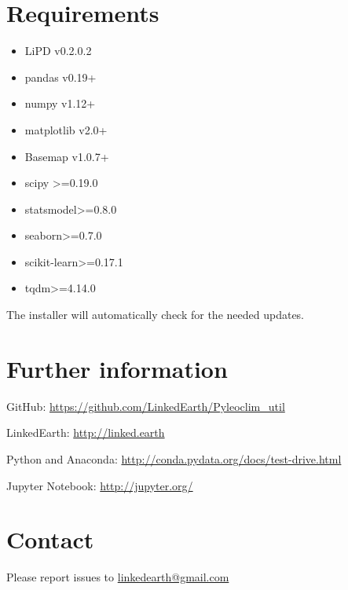 \documentclass[letterpaper,10pt,english]{sphinxmanual}
\begin{document}
\section{Requirements}
\label{\detokenize{Introduction:requirements}}\begin{itemize}
\item {} 
LiPD v0.2.0.2

\item {} 
pandas v0.19+

\item {} 
numpy v1.12+

\item {} 
matplotlib v2.0+

\item {} 
Basemap v1.0.7+

\item {} 
scipy \textgreater{}=0.19.0

\item {} 
statsmodel\textgreater{}=0.8.0

\item {} 
seaborn\textgreater{}=0.7.0

\item {} 
scikit-learn\textgreater{}=0.17.1

\item {} 
tqdm\textgreater{}=4.14.0

\end{itemize}

The installer will automatically check for the needed updates.


\section{Further information}
\label{\detokenize{Introduction:further-information}}
\begin{DUlineblock}{0em}
\item[] GitHub: \url{https://github.com/LinkedEarth/Pyleoclim\_util}
\item[] LinkedEarth: \url{http://linked.earth}
\item[] Python and Anaconda: \url{http://conda.pydata.org/docs/test-drive.html}
\item[] Jupyter Notebook: \url{http://jupyter.org/}
\end{DUlineblock}


\section{Contact}
\label{\detokenize{Introduction:contact}}
Please report issues to \href{mailto:linkedearth@gmail.com}{linkedearth@gmail.com}
\end{document}
